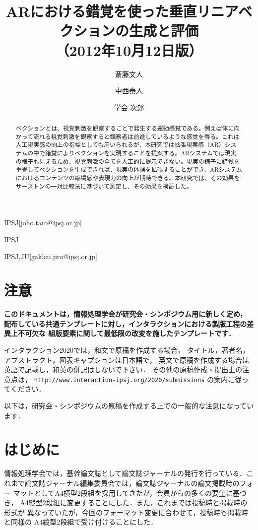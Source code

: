 \documentclass[submit,techrep]{ipsj}
\begin{document}
\title{ARにおける錯覚を使った垂直リニアベクションの生成と評価\\
（2012年10月12日版）}



\author{斎藤文人}{}{IPSJ}[joho.taro@ipsj.or.jp]
\author{中西泰人}{}{IPSJ}
\author{学会 次郎}{}{IPSJ,JU}[gakkai.jiro@ipsj.or.jp]

\begin{abstract}
ベクションとは、視覚刺激を観察することで発生する運動感覚である。例えば体に向かって流れる視覚刺激を観察すると観察者は前進しているような感覚を得る。これは人工現実感の向上の指標としても用いられるが、本研究では拡張現実感（AR）システムの中で錯覚によりベクションを実現することを提案する。ARシステムでは現実の様子も見えるため、視覚刺激の全てを人工的に提示できない。現実の様子に錯覚を重畳してベクションを生成できれば、現実の体験を拡張することができ、ARシステムにおけるコンテンツの臨場感や表現力の向上が期待できる。本研究では、その効果をサーストンの一対比較法に基づいて測定し、その効果を検証した。
\end{abstract}

\maketitle

\section{注意}

{\bf
このドキュメントは，情報処理学会が研究会・シンポジウム用に新しく定め，
配布している共通テンプレートに対し，インタラクションにおける製版工程の差異上不可欠な
組版要素に関して最低限の改変を施したテンプレートです．

インタラクション2020では，和文で原稿を作成する場合，
タイトル，著者名，アブストラクト，図表キャプションは日本語で，
英文で原稿を作成する場合は英語で記載し，和英の併記はしないで下さい．
その他の原稿作成・提出上の注意点は，
\texttt{http://www.interaction-ipsj.org/2020/submissions} の案内に従ってください．

以下は，研究会・シンポジウムの原稿を作成する上での一般的な注意になっています．
}

\section{はじめに}

情報処理学会では，基幹論文誌として論文誌ジャーナルの発行を行っている．こ
れまで論文誌ジャーナル編集委員会では，論文誌ジャーナルの論文掲載時のフォー
マットとしてA4横型2段組を採用してきたが，会員からの多くの要望に基づき，
A4縦型2段組に変更することにした．また，これまでは投稿時と掲載時の形式が
異なっていたが，今回のフォーマット変更に合わせて，投稿時も掲載時と同様の
A4縦型2段組で受け付けることにした．
\end{document}
